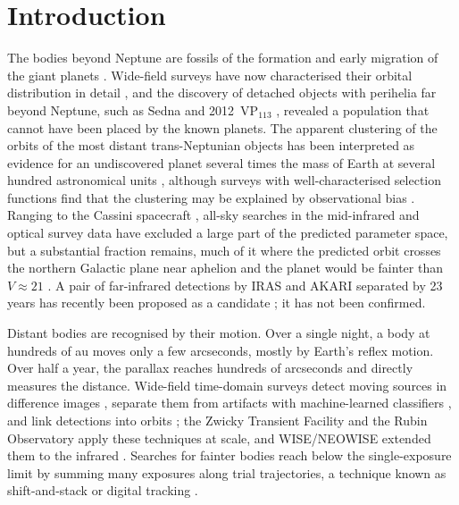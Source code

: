 \documentclass[twocolumn,linenumbers]{aastex702}
\begin{document}
\section{Introduction}\label{sec:intro}

The bodies beyond Neptune are fossils of the formation and early migration of the giant planets \citep{gladman08}. Wide-field surveys have now characterised their orbital distribution in detail \citep{bannister18,bernardinelli20,bernardinelli22}, and the discovery of detached objects with perihelia far beyond Neptune, such as Sedna and 2012~VP$_{113}$ \citep{brown04,trujillo14}, revealed a population that cannot have been placed by the known planets. The apparent clustering of the orbits of the most distant trans-Neptunian objects \citep{trujillo14,sheppard16} has been interpreted as evidence for an undiscovered planet several times the mass of Earth at several hundred astronomical units \citep{batygin16,brown16,brown21,batygin19}, although surveys with well-characterised selection functions find that the clustering may be explained by observational bias \citep{shankman17,napier21}. Ranging to the Cassini spacecraft \citep{fienga16,holman16}, all-sky searches in the mid-infrared \citep{luhman14,meisner18} and optical survey data have excluded a large part of the predicted parameter space, but a substantial fraction remains, much of it where the predicted orbit crosses the northern Galactic plane near aphelion and the planet would be fainter than $V \approx 21$ \citep{brown24}. A pair of far-infrared detections by IRAS and AKARI separated by 23 years has recently been proposed as a candidate \citep{phan25}; it has not been confirmed.

Distant bodies are recognised by their motion. Over a single night, a body at hundreds of au moves only a few arcseconds, mostly by Earth's reflex motion. Over half a year, the parallax reaches hundreds of arcseconds and directly measures the distance. Wide-field time-domain surveys detect moving sources in difference images \citep{alard98,bramich08,zackay16,masci19}, separate them from artifacts with machine-learned classifiers \citep{bloom12,brink13,goldstein15,cabrera17,duev19}, and link detections into orbits \citep{kubica07,denneau13,holman18}; the Zwicky Transient Facility \citep{bellm19} and the Rubin Observatory \citep{ivezic19} apply these techniques at scale, and WISE/NEOWISE extended them to the infrared \citep{wright10,mainzer11}. Searches for fainter bodies reach below the single-exposure limit by summing many exposures along trial trajectories, a technique known as shift-and-stack or digital tracking \citep{gladman98,bernstein04,holman04,whidden19,smotherman21}.
\end{document}
